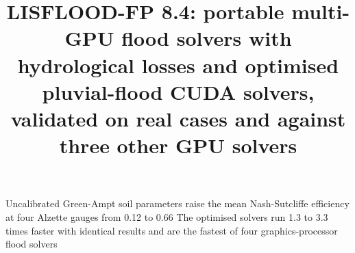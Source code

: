 \documentclass[draft,linenumbers]{agujournal2025}
\begin{document}

\title{LISFLOOD-FP 8.4: portable multi-GPU flood solvers with hydrological losses and optimised pluvial-flood CUDA solvers, validated on real cases and against three other GPU solvers}




%
{Uncalibrated Green-Ampt soil parameters raise the mean Nash-Sutcliffe efficiency at four Alzette gauges from 0.12 to 0.66}%
{The optimised solvers run 1.3 to 3.3 times faster with identical results and are the fastest of four graphics-processor flood solvers}

\maketitle
\end{document}
